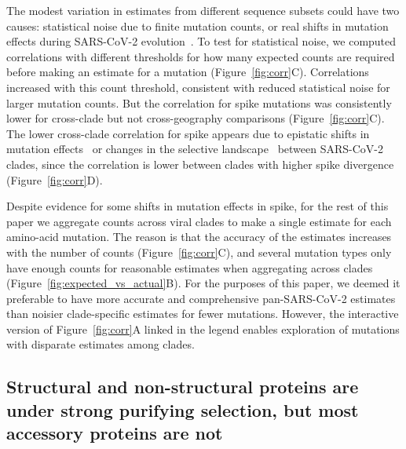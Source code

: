 \documentclass[9pt,twocolumn,twoside]{gsajnl_modified}
\begin{document}
The modest variation in estimates from different sequence subsets could have two causes: statistical noise due to finite mutation counts, or real shifts in mutation effects during SARS-CoV-2 evolution~\citep{starr2022shifting,moulana2022compensatory}.
To test for statistical noise, we computed correlations with different thresholds for how many expected counts are required before making an estimate for a mutation (Figure~\ref{fig:corr}C).
Correlations increased with this count threshold, consistent with reduced statistical noise for larger mutation counts.
But the correlation for spike mutations was consistently lower for cross-clade but not cross-geography comparisons (Figure~\ref{fig:corr}C).
The lower cross-clade correlation for spike appears due to epistatic shifts in mutation effects~\citep{starr2022shifting, moulana2022compensatory, pollock2012amino, shah2015contingency, lee2018deep} or changes in the selective landscape~\citep{sun2023rapidly} between SARS-CoV-2 clades, since the correlation is lower between clades with higher spike divergence (Figure~\ref{fig:corr}D).

Despite evidence for some shifts in mutation effects in spike, for the rest of this paper we aggregate counts across viral clades to make a single estimate for each amino-acid mutation.
The reason is that the accuracy of the estimates increases with the number of counts (Figure~\ref{fig:corr}C), and several mutation types only have enough counts for reasonable estimates when aggregating across clades (Figure~\ref{fig:expected_vs_actual}B).
For the purposes of this paper, we deemed it preferable to have more accurate and comprehensive pan-SARS-CoV-2 estimates than noisier clade-specific estimates for fewer mutations.
However, the interactive version of Figure~\ref{fig:corr}A linked in the legend enables exploration of mutations with disparate estimates among clades.

\subsection*{Structural and non-structural proteins are under strong purifying selection, but most accessory proteins are not}
\end{document}

